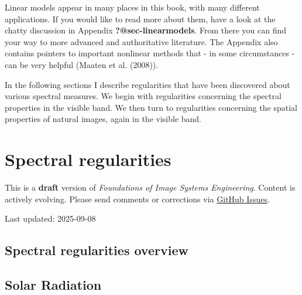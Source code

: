 \documentclass[
  letterpaper,
]{book}
\begin{document}
Linear models appear in many places in this book, with many different
applications. If you would like to read more about them, have a look at
the chatty discussion in Appendix \textbf{?@sec-linearmodels}. From
there you can find your way to more advanced and authoritative
literature. The Appendix also contains pointers to important nonlinear
methods that - in some circumstances - can be very helpful (Maaten et
al. (2008)).

In the following sections I describe regularities that have been
discovered about various spectral measures. We begin with regularities
concerning the spectral properties in the visible band. We then turn to
regularities concerning the spatial properties of natural images, again
in the visible band.

\chapter{Spectral regularities}\label{sec-spectral-regularities}

\begin{tcolorbox}[enhanced jigsaw, opacityback=0, breakable, coltitle=black, leftrule=.75mm, left=2mm, colframe=quarto-callout-warning-color-frame, opacitybacktitle=0.6, bottomtitle=1mm, bottomrule=.15mm, toprule=.15mm, title=\textcolor{quarto-callout-warning-color}{\faExclamationTriangle}\hspace{0.5em}{Work in Progress}, titlerule=0mm, toptitle=1mm, colback=white, rightrule=.15mm, colbacktitle=quarto-callout-warning-color!10!white, arc=.35mm]

This is a \textbf{draft} version of \emph{Foundations of Image Systems
Engineering}. Content is actively evolving. Please send comments or
corrections via \href{https://github.com/wandell/FISE-git/issues}{GitHub
Issues}.

Last updated: 2025-09-08

\end{tcolorbox}

\section{Spectral regularities
overview}\label{sec-spectral-regularities-overview}

\section{Solar Radiation}\label{solar-radiation}
\end{document}
